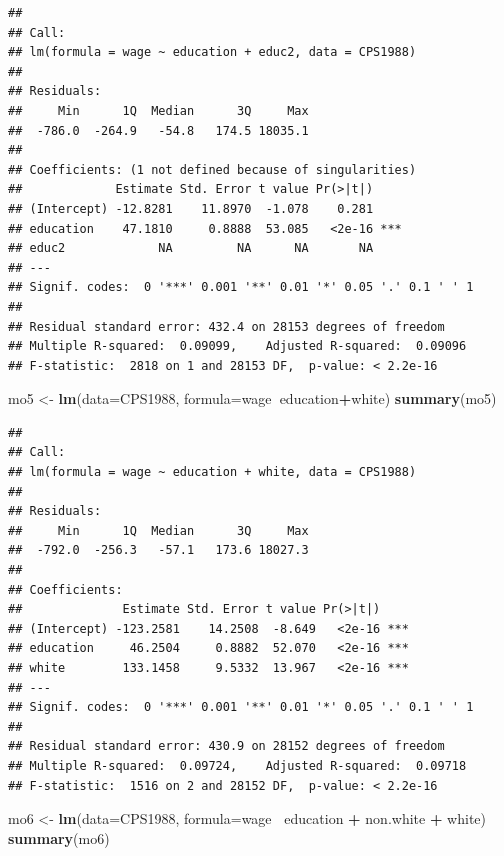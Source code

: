 \documentclass[
]{book}
\newenvironment{Shaded}{\begin{snugshade}}{\end{snugshade}}
\newcommand{\DataTypeTok}[1]{\textcolor[rgb]{0.13,0.29,0.53}{#1}}
\newcommand{\KeywordTok}[1]{\textcolor[rgb]{0.13,0.29,0.53}{\textbf{#1}}}
\newcommand{\NormalTok}[1]{#1}
\newcommand{\OperatorTok}[1]{\textcolor[rgb]{0.81,0.36,0.00}{\textbf{#1}}}
\newcommand{\StringTok}[1]{\textcolor[rgb]{0.31,0.60,0.02}{#1}}
\begin{document}
\begin{verbatim}
## 
## Call:
## lm(formula = wage ~ education + educ2, data = CPS1988)
## 
## Residuals:
##     Min      1Q  Median      3Q     Max 
##  -786.0  -264.9   -54.8   174.5 18035.1 
## 
## Coefficients: (1 not defined because of singularities)
##             Estimate Std. Error t value Pr(>|t|)    
## (Intercept) -12.8281    11.8970  -1.078    0.281    
## education    47.1810     0.8888  53.085   <2e-16 ***
## educ2             NA         NA      NA       NA    
## ---
## Signif. codes:  0 '***' 0.001 '**' 0.01 '*' 0.05 '.' 0.1 ' ' 1
## 
## Residual standard error: 432.4 on 28153 degrees of freedom
## Multiple R-squared:  0.09099,    Adjusted R-squared:  0.09096 
## F-statistic:  2818 on 1 and 28153 DF,  p-value: < 2.2e-16
\end{verbatim}

\begin{Shaded}
\begin{Highlighting}[]
\NormalTok{mo5 <-}\StringTok{  }\KeywordTok{lm}\NormalTok{(}\DataTypeTok{data=}\NormalTok{CPS1988, }\DataTypeTok{formula=}\NormalTok{wage}\OperatorTok{~}\NormalTok{education}\OperatorTok{+}\NormalTok{white)}
\KeywordTok{summary}\NormalTok{(mo5)}
\end{Highlighting}
\end{Shaded}

\begin{verbatim}
## 
## Call:
## lm(formula = wage ~ education + white, data = CPS1988)
## 
## Residuals:
##     Min      1Q  Median      3Q     Max 
##  -792.0  -256.3   -57.1   173.6 18027.3 
## 
## Coefficients:
##              Estimate Std. Error t value Pr(>|t|)    
## (Intercept) -123.2581    14.2508  -8.649   <2e-16 ***
## education     46.2504     0.8882  52.070   <2e-16 ***
## white        133.1458     9.5332  13.967   <2e-16 ***
## ---
## Signif. codes:  0 '***' 0.001 '**' 0.01 '*' 0.05 '.' 0.1 ' ' 1
## 
## Residual standard error: 430.9 on 28152 degrees of freedom
## Multiple R-squared:  0.09724,    Adjusted R-squared:  0.09718 
## F-statistic:  1516 on 2 and 28152 DF,  p-value: < 2.2e-16
\end{verbatim}

\begin{Shaded}
\begin{Highlighting}[]
\NormalTok{mo6 <-}\StringTok{  }\KeywordTok{lm}\NormalTok{(}\DataTypeTok{data=}\NormalTok{CPS1988, }\DataTypeTok{formula=}\NormalTok{wage}\OperatorTok{~}\StringTok{ }\NormalTok{education }\OperatorTok{+}\StringTok{ }\NormalTok{non.white }\OperatorTok{+}\StringTok{ }\NormalTok{white)}
\KeywordTok{summary}\NormalTok{(mo6)}
\end{Highlighting}
\end{Shaded}
\end{document}
